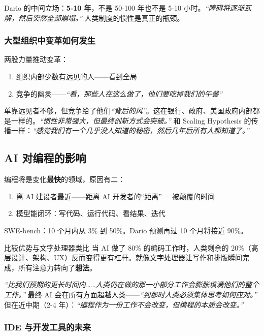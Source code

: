 Dario 的中间立场：\textbf{5-10 年}，不是 50-100 年也不是 5-10 小时。\textit{``障碍将逐渐瓦解，然后突然全部崩塌。''} 人类制度的惯性是真正的瓶颈。

\subsubsection{大型组织中变革如何发生}

两股力量推动变革：
\begin{enumerate}
    \item 组织内部少数有远见的人——看到全局
    \item 竞争的幽灵——\textit{``看，那些人在这么做了，他们要吃掉我们的午餐''}
\end{enumerate}

单靠远见者不够，但竞争给了他们\textit{``背后的风''}。这在银行、政府、美国政府内部都是一样的。\textit{``惯性非常强大，但最终创新方式会突破。''} 和 Scaling Hypothesis 的传播一样：\textit{``感觉我们有一个几乎没人知道的秘密，然后几年后所有人都知道了。''}

\subsection{AI 对编程的影响}

编程将是变化\textbf{最快}的领域，原因有二：
\begin{enumerate}
    \item 离 AI 建设者最近——距离 AI 开发者的``距离'' = 被颠覆的时间
    \item 模型能闭环：写代码、运行代码、看结果、迭代
\end{enumerate}

SWE-bench：10 个月内从 3\% 到 50\%。Dario 预测再过 10 个月将接近 90\%。

\begin{knowledgebox}{比较优势与文字处理器类比}
当 AI 做了 80\% 的编码工作时，人类剩余的 20\%（高层设计、架构、UX）反而变得更有杠杆。就像文字处理器让写作和排版瞬间完成，所有注意力转向了\textbf{想法}。

\textit{``比我们预期的更长时间内……人类仍在做的那一小部分工作会膨胀填满他们的整个工作。''} 最终 AI 会在所有方面超越人类——\textit{``到那时人类必须集体思考如何应对。''} 但在近中期（2-4 年）：\textit{``编程作为一份工作不会改变，但编程的本质会改变。''}
\end{knowledgebox}

\subsubsection{IDE 与开发工具的未来}

